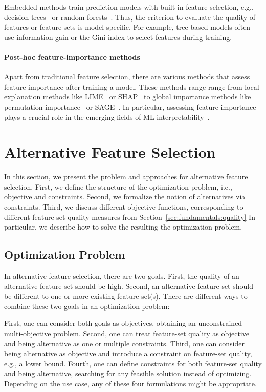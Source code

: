 \documentclass{article}
\theoremstyle{definition}
\begin{document}
Embedded methods train prediction models with built-in feature selection, e.g., decision trees~\cite{breiman1984classification} or random forests~\cite{breiman2001random}.
Thus, the criterion to evaluate the quality of features or feature sets is model-specific.
For example, tree-based models often use information gain or the Gini index to select features during training.

\paragraph{Post-hoc feature-importance methods}

Apart from traditional feature selection, there are various methods that assess feature importance after training a model.
These methods range range from local explanation methods like LIME~\cite{ribeiro2016should} or SHAP~\cite{lundberg2017unified} to global importance methods like permutation importance~\cite{breiman2001random} or SAGE~\cite{covert2020understanding}.
In particular, assessing feature importance plays a crucial role in the emerging fields of ML interpretability~\cite{carvalho2019machine}.

\section{Alternative Feature Selection}
\label{sec:approach}

In this section, we present the problem and approaches for alternative feature selection.
First, we define the structure of the optimization problem, i.e., objective and constraints.
Second, we formalize the notion of alternatives via constraints.
Third, we discuss different objective functions, corresponding to different feature-set quality measures from Section~\ref{sec:fundamentals:quality}
In particular, we describe how to solve the resulting the optimization problem.

\subsection{Optimization Problem}
\label{sec:approach:problem}

In alternative feature selection, there are two goals.
First, the quality of an alternative feature set should be high.
Second, an alternative feature set should be different to one or more existing feature set(s).
There are different ways to combine these two goals in an optimization problem:

First, one can consider both goals as objectives, obtaining an unconstrained multi-objective problem.
Second, one can treat feature-set quality as objective and being alternative as one or multiple constraints.
Third, one can consider being alternative as objective and introduce a constraint on feature-set quality, e.g., a lower bound.
Fourth, one can define constraints for both feature-set quality and being alternative, searching for any feasible solution instead of optimizing.
Depending on the use case, any of these four formulations might be appropriate.
\end{document}
